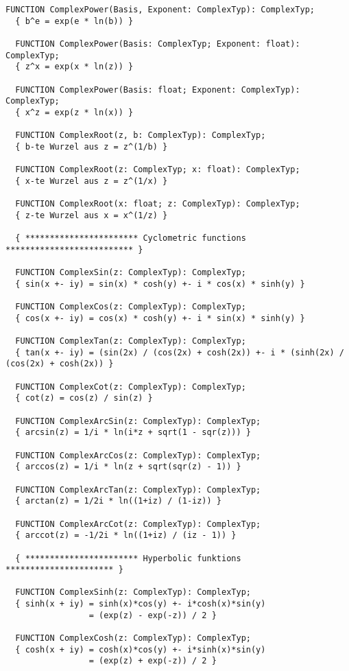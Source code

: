 \begin{refsection}
\begin{lstlisting}[caption=Interface of \texttt{Complex}]
  FUNCTION ComplexPower(Basis, Exponent: ComplexTyp): ComplexTyp;
  { b^e = exp(e * ln(b)) }

  FUNCTION ComplexPower(Basis: ComplexTyp; Exponent: float): ComplexTyp;
  { z^x = exp(x * ln(z)) }

  FUNCTION ComplexPower(Basis: float; Exponent: ComplexTyp): ComplexTyp;
  { x^z = exp(z * ln(x)) }

  FUNCTION ComplexRoot(z, b: ComplexTyp): ComplexTyp;
  { b-te Wurzel aus z = z^(1/b) }

  FUNCTION ComplexRoot(z: ComplexTyp; x: float): ComplexTyp;
  { x-te Wurzel aus z = z^(1/x) }

  FUNCTION ComplexRoot(x: float; z: ComplexTyp): ComplexTyp;
  { z-te Wurzel aus x = x^(1/z) }

  { *********************** Cyclometric functions ************************** }

  FUNCTION ComplexSin(z: ComplexTyp): ComplexTyp;
  { sin(x +- iy) = sin(x) * cosh(y) +- i * cos(x) * sinh(y) }

  FUNCTION ComplexCos(z: ComplexTyp): ComplexTyp;
  { cos(x +- iy) = cos(x) * cosh(y) +- i * sin(x) * sinh(y) }

  FUNCTION ComplexTan(z: ComplexTyp): ComplexTyp;
  { tan(x +- iy) = (sin(2x) / (cos(2x) + cosh(2x)) +- i * (sinh(2x) / (cos(2x) + cosh(2x)) }

  FUNCTION ComplexCot(z: ComplexTyp): ComplexTyp;
  { cot(z) = cos(z) / sin(z) }

  FUNCTION ComplexArcSin(z: ComplexTyp): ComplexTyp;
  { arcsin(z) = 1/i * ln(i*z + sqrt(1 - sqr(z))) }

  FUNCTION ComplexArcCos(z: ComplexTyp): ComplexTyp;
  { arccos(z) = 1/i * ln(z + sqrt(sqr(z) - 1)) }

  FUNCTION ComplexArcTan(z: ComplexTyp): ComplexTyp;
  { arctan(z) = 1/2i * ln((1+iz) / (1-iz)) }

  FUNCTION ComplexArcCot(z: ComplexTyp): ComplexTyp;
  { arccot(z) = -1/2i * ln((1+iz) / (iz - 1)) }

  { *********************** Hyperbolic funktions ********************** }

  FUNCTION ComplexSinh(z: ComplexTyp): ComplexTyp;
  { sinh(x + iy) = sinh(x)*cos(y) +- i*cosh(x)*sin(y)
                 = (exp(z) - exp(-z)) / 2 }

  FUNCTION ComplexCosh(z: ComplexTyp): ComplexTyp;
  { cosh(x + iy) = cosh(x)*cos(y) +- i*sinh(x)*sin(y)
                 = (exp(z) + exp(-z)) / 2 }


\end{lstlisting}
\end{refsection}
